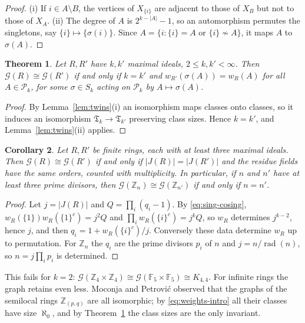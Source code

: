 \documentclass[11pt]{amsart}
\newtheorem{theorem}{Theorem}[section]
\newtheorem{corollary}[theorem]{Corollary}
\theoremstyle{definition}
\theoremstyle{remark}
\newcommand{\Jac}{J}
\newcommand{\G}{\mathcal{G}}
\newcommand{\TG}{\mathfrak{T}}
\newcommand{\Pk}{\mathcal{P}_k}
\newcommand{\Z}{\mathbb{Z}}
\newcommand{\FF}{\mathbb{F}}
\newcommand{\co}[1]{{#1}^{c}}
\newcommand{\rad}{\operatorname{rad}}
\begin{document}
\begin{proof}
(i) If $i\in A\setminus B$, the vertices of $X_{\{i\}}$ are adjacent to those of $X_B$ but not to
those of $X_A$. (ii) The degree of $A$ is $2^{k-|A|}-1$, so an automorphism permutes the singletons,
say $\{i\}\mapsto\{\sigma(i)\}$. Since $A=\{i:\{i\}=A\text{ or }\{i\}\not\sim A\}$, it maps $A$ to
$\sigma(A)$.
\end{proof}

\begin{theorem}\label{thm:iso}
Let $R,R'$ have $k,k'$ maximal ideals, $2\le k,k'<\infty$. Then $\G(R)\cong\G(R')$ if and only if
$k=k'$ and $w_{R'}(\sigma(A))=w_R(A)$ for all $A\in\Pk$, for some $\sigma\in S_k$ acting on $\Pk$
by $A\mapsto\sigma(A)$.
\end{theorem}

\begin{proof}
By Lemma~\ref{lem:twins}(i) an isomorphism maps classes onto classes, so it induces an isomorphism
$\TG_k\to\TG_{k'}$ preserving class sizes. Hence $k=k'$, and Lemma~\ref{lem:twins}(ii) applies.
\end{proof}

\begin{corollary}\label{cor:iso-finite}
Let $R,R'$ be finite rings, each with at least three maximal ideals. Then $\G(R)\cong\G(R')$ if and only if
$|\Jac(R)|=|\Jac(R')|$ and the residue fields have the same orders, counted with multiplicity. In
particular, if $n$ and $n'$ have at least three prime divisors, then $\G(\Z_n)\cong\G(\Z_{n'})$ if
and only if $n=n'$.
\end{corollary}

\begin{proof}
Let $j=|\Jac(R)|$ and $Q=\prod_i(q_i-1)$. By \eqref{eq:sing-cosing},
$w_R(\{1\})w_R(\co{\{1\}})=j^2Q$ and $\prod_iw_R(\co{\{i\}})=j^kQ$, so $w_R$ determines $j^{k-2}$,
hence $j$, and then $q_i=1+w_R(\co{\{i\}})/j$. Conversely these data determine $w_R$ up to
permutation. For $\Z_n$ the $q_i$ are the prime divisors $p_i$ of $n$ and $j=n/\rad(n)$, so
$n=j\prod_ip_i$ is determined.
\end{proof}

This fails for $k=2$: $\G(\Z_4\times\Z_4)\cong\G(\FF_5\times\FF_5)\cong K_{4,4}$. For infinite rings
the graph retains even less. Moconja and Petrovi\'c \cite[Example~4.1]{MP11} observed that the
graphs of the semilocal rings $\Z_{(p,q)}$ are all isomorphic; by \eqref{eq:weights-intro} all
their classes have size $\aleph_0$, and by Theorem~\ref{thm:iso} the class sizes are the only
invariant.
\end{document}
